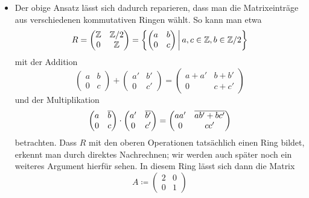 \begin{itemize}
  \item
    Der obige Ansatz lässt sich dadurch reparieren, dass man die Matrixeinträge aus verschiedenen kommutativen Ringen wählt.
    So kann man etwa
    \[
        R
      = \begin{pmatrix}
          \Integer  & \Integer/2 \\
          0         & \Integer
        \end{pmatrix}
      = \left\{
          \begin{pmatrix}
            a & b \\
            0 & c
          \end{pmatrix}
        \suchthat*
          a, c \in \Integer,
          b \in \Integer/2
        \right\}
    \]
    mit der Addition
    \[
      \begin{pmatrix}
        a & b \\
        0 & c
      \end{pmatrix}
      +
      \begin{pmatrix}
        a'  & b'  \\
        0   & c'
      \end{pmatrix}
      =
      \begin{pmatrix}
        a+a'  & b+b'  \\
        0     & c+c'
      \end{pmatrix}
    \]
    und der Multiplikation
    \[
      \begin{pmatrix}
        a & \overline{b} \\
        0 & c
      \end{pmatrix}
      \cdot
      \begin{pmatrix}
        a'  & \overline{b'}  \\
        0   & c'
      \end{pmatrix}
      =
      \begin{pmatrix}
        aa' & \overline{a b' + b c'}  \\
        0   & cc'
      \end{pmatrix}
    \]
    betrachten.
    Dass $R$ mit den oberen Operationen tatsächlich einen Ring bildet, erkennt man durch direktes Nachrechnen;
    wir werden auch später noch ein weiteres Argument hierfür sehen.
    In diesem Ring lässt sich dann die Matrix
    \[
                A
      \coloneqq \begin{pmatrix}
                  2 & 0 \\
                  0 & 1
                \end{pmatrix}
\]
\end{itemize}
